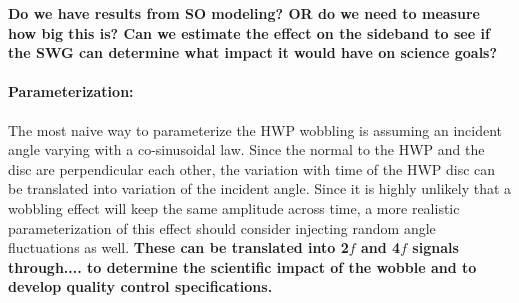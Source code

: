 \textbf{Do we have results from SO modeling? OR do we need to measure how big this is? Can we estimate the effect on the sideband to see if the SWG can determine what impact it would have on science goals?}

\paragraph{Parameterization:}
The most naive way to parameterize the HWP wobbling is assuming an incident angle varying with a co-sinusoidal law. Since the normal to the HWP and the disc are perpendicular each other, the variation with time of the HWP disc can be translated
into variation of the incident angle. Since it is highly unlikely that a wobbling effect will keep the same amplitude across time, a more realistic parameterization of this effect should consider injecting random angle fluctuations as well. \textbf{These can be translated into 2$f$ and 4$f$ signals through.... to determine the scientific impact of the wobble and to develop quality control specifications.}


